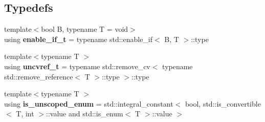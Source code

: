 \subsection*{Typedefs}
\begin{DoxyCompactItemize}
\item 
\mbox{\label{namespacenlohmann_1_1detail_a02bcbc878bee413f25b985ada771aa9c}} 
{\footnotesize template$<$bool B, typename T  = void$>$ }\\using {\bfseries enable\+\_\+if\+\_\+t} = typename std\+::enable\+\_\+if$<$ B, T $>$\+::type
\item 
\mbox{\label{namespacenlohmann_1_1detail_a53a082eedad9f4729fcd8fed552a21f7}} 
{\footnotesize template$<$typename T $>$ }\\using {\bfseries uncvref\+\_\+t} = typename std\+::remove\+\_\+cv$<$ typename std\+::remove\+\_\+reference$<$ T $>$\+::type $>$\+::type
\item 
\mbox{\label{namespacenlohmann_1_1detail_ab0f6dad10410de436710870e8acc386b}} 
{\footnotesize template$<$typename T $>$ }\\using {\bfseries is\+\_\+unscoped\+\_\+enum} = std\+::integral\+\_\+constant$<$ bool, std\+::is\+\_\+convertible$<$ T, int $>$\+::value and std\+::is\+\_\+enum$<$ T $>$\+::value $>$
\end{DoxyCompactItemize}
